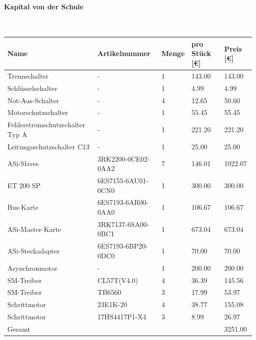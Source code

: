 \paragraph{Kapital von der Schule}\mbox{}\\
\begin{table}[H]
    \begin{tabular}{lllll}
    Name                & Artikelnummer                          & Menge & pro Stück {[}€{]} & Preis {[}€{]} \\ \hline
    Trennschalter       & -                                     & 1     & 143.00            & 143.00        \\
    Schlüsselschalter   & -                                     & 1     & 4.99              & 4.99          \\
    Not-Aus-Schalter    & -                                     & 4     & 12.65             & 50.60         \\
    Motorschutzschalter & -                                     & 1     & 55.45             & 55.45         \\
    Fehlerstromschutzschalter Typ A & -                         & 1     & 221.20            & 221.20        \\
    Leitungsschutzschalter C13 & -                             & 1     & 25.00             & 25.00         \\
    ASi-Slaves          & 3RK2200-0CE02-0AA2                   & 7     & 146.01            & 1022.07       \\
    ET 200 SP           & 6ES7155-6AU01-0CN0                   & 1     & 300.00            & 300.00        \\
    Bus-Karte           & 6ES7193-6AR00-0AA0                   & 1     & 106.67            & 106.67        \\
    ASi-Master-Karte    & 3RK7137-6SA00-0BC1                   & 1     & 673.04            & 673.04        \\
    ASi-Steckadapter    & 6ES7193-6BP20-0DC0                   & 1     & 70.00             & 70.00         \\
    Asynchronmotor      & -                                     & 1     & 200.00            & 200.00        \\
    SM-Treiber          & CL57T(V4.0)                          & 4     & 36.39             & 145.56        \\
    SM-Treiber          & TB6560                               & 3     & 17.99             & 53.97         \\
    Schrittmotor        & 23E1K-20                             & 4     & 38.77             & 155.08        \\
    Schrittmotor        & 17HS4417P1-X4                        & 3     & 8.99              & 26.97         \\ \hline
    Gesamt              &                                      &       &                   & 3251.00       
    \end{tabular}
\end{table}
